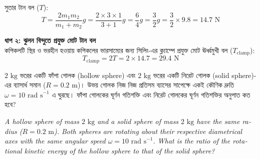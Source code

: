 \documentclass[12pt, a4paper]{article}
\begin{document}
{\begin{tcolorbox}[solutionbox={সমাধান (Solution)}]
    সুতার টান বল ($T$):
    \[ T = \frac{2 m_1 m_2}{m_1 + m_2} g = \frac{2 \times 3 \times 1}{3 + 1} g = \frac{6}{4} g = \frac{3}{2} g = \frac{3}{2} \times 9.8 = 14.7\text{ N} \]
    
    \vspace{0.5em}
    \noindent\textbf{ধাপ ২: ঝুলন বিন্দুতে প্রযুক্ত মোট টান বল} \\
    কপিকলটি স্থির ও ভরহীন হওয়ায় কপিকলের ভারসাম্যের জন্য সিলিং-এর ক্ল্যাম্পে প্রযুক্ত মোট ঊর্ধ্বমুখী বল ($T_{\text{clamp}}$):
    \[ T_{\text{clamp}} = 2T = 2 \times 14.7 = \mathbf{29.4}\text{ N} \]
\end{tcolorbox}

\newpage

\begin{tcolorbox}[questionbox={প্রশ্ন (Question) 10}]
    \noindent
    $2\text{ kg}$ ভরের একটি ফাঁপা গোলক (hollow sphere) এবং $2\text{ kg}$ ভরের একটি নিরেট গোলক (solid sphere)-এর ব্যাসার্ধ সমান ($R = 0.2\text{ m}$)। উভয় গোলক নিজ নিজ প্রতিসম ব্যাসের সাপেক্ষে একই কৌণিক দ্রুতি $\omega = 10\text{ rad s}^{-1}$ এ ঘুরছে। ফাঁপা গোলকের ঘূর্ণন গতিশক্তি এবং নিরেট গোলকের ঘূর্ণন গতিশক্তির অনুপাত কত হবে?
    
    \vspace{0.8em}
    \begin{english}
    \noindent\textit{\color{darkgray}
    A hollow sphere of mass $2\text{ kg}$ and a solid sphere of mass $2\text{ kg}$ have the same radius ($R = 0.2\text{ m}$). Both spheres are rotating about their respective diametrical axes with the same angular speed $\omega = 10\text{ rad s}^{-1}$. What is the ratio of the rotational kinetic energy of the hollow sphere to that of the solid sphere?
    }
    \end{english}
\end{tcolorbox}

\vspace{1em}
\begin{center}
\end{center}}
\end{document}
